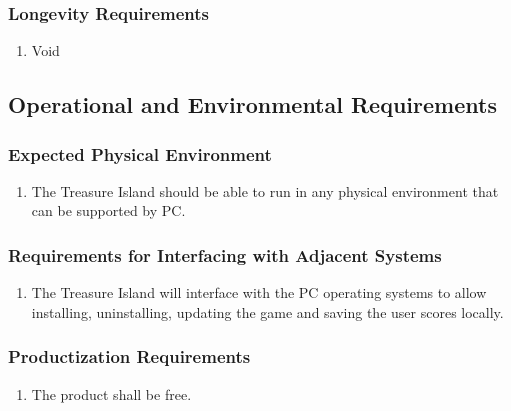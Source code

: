 \documentclass[]{article}
\begin{document}

\subsubsection{Longevity Requirements}
\label{ssub:longevity_requirements}
\begin{enumerate}[{PR}1. ]
	\item Void
\end{enumerate}



\subsection{Operational and Environmental Requirements}
\label{sub:operational_and_environmental_requirements}

\subsubsection{Expected Physical Environment}
\label{ssub:expected_physical_environment}

\begin{enumerate}[{OE}1. ]
	\item The Treasure Island should be able to run in any physical environment that can be supported by PC.
\end{enumerate}


\subsubsection{Requirements for Interfacing with Adjacent Systems}
\label{ssub:requirements_for_interfacing_with_adjacent_systems}

\begin{enumerate}[{OE}1. ]
    \item The Treasure Island will interface with the PC operating systems to allow installing, uninstalling, updating the game and saving the user scores locally.
\end{enumerate}


\subsubsection{Productization Requirements}
\label{ssub:productization_requirements}
\begin{enumerate}[{OE}1. ]
	\item The product shall be free.
\end{enumerate}
\end{document}
